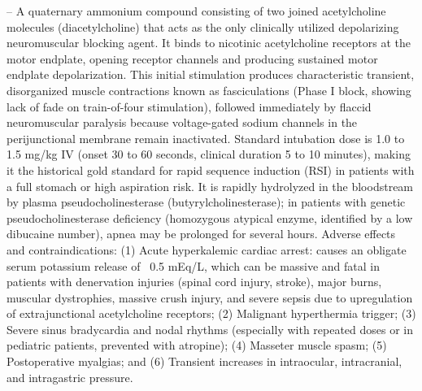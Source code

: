 -- A quaternary ammonium compound consisting of two joined acetylcholine molecules (diacetylcholine) that acts as the only clinically utilized depolarizing neuromuscular blocking agent. It binds to nicotinic acetylcholine receptors at the motor endplate, opening receptor channels and producing sustained motor endplate depolarization. This initial stimulation produces characteristic transient, disorganized muscle contractions known as fasciculations (Phase I block, showing lack of fade on train-of-four stimulation), followed immediately by flaccid neuromuscular paralysis because voltage-gated sodium channels in the perijunctional membrane remain inactivated. Standard intubation dose is 1.0 to 1.5 mg/kg IV (onset 30 to 60 seconds, clinical duration 5 to 10 minutes), making it the historical gold standard for rapid sequence induction (RSI) in patients with a full stomach or high aspiration risk. It is rapidly hydrolyzed in the bloodstream by plasma pseudocholinesterase (butyrylcholinesterase); in patients with genetic pseudocholinesterase deficiency (homozygous atypical enzyme, identified by a low dibucaine number), apnea may be prolonged for several hours. Adverse effects and contraindications: (1) Acute hyperkalemic cardiac arrest: causes an obligate serum potassium release of ~0.5 mEq/L, which can be massive and fatal in patients with denervation injuries (spinal cord injury, stroke), major burns, muscular dystrophies, massive crush injury, and severe sepsis due to upregulation of extrajunctional acetylcholine receptors; (2) Malignant hyperthermia trigger; (3) Severe sinus bradycardia and nodal rhythms (especially with repeated doses or in pediatric patients, prevented with atropine); (4) Masseter muscle spasm; (5) Postoperative myalgias; and (6) Transient increases in intraocular, intracranial, and intragastric pressure.

